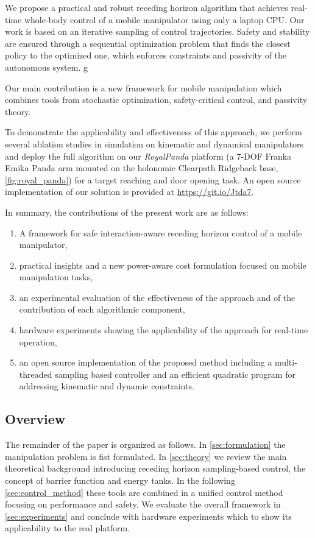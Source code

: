 We propose a practical and robust receding horizon algorithm that achieves real-time whole-body control of a mobile manipulator using only a laptop CPU. Our work is based on an iterative sampling of control trajectories. Safety and stability are ensured through a sequential optimization problem that finds the closest policy to the optimized one, which enforces constraints and passivity of the autonomous system. g

Our main contribution is a new framework for mobile manipulation which combines tools from stochastic optimization, safety-critical control, and passivity theory.

To demonstrate the applicability and effectiveness of this approach, we perform several ablation studies in simulation on kinematic and dynamical manipulators and deploy the full algorithm on our \textit{RoyalPanda} platform (a 7-DOF Franka Emika Panda arm mounted on the holonomic Clearpath Ridgeback base, \fig\ref{fig:royal_panda}) for a target reaching and door opening task. An open source implementation of our solution is provided at \url{https://git.io/Jtda7}.

In summary, the contributions of the present work are as follows:
\begin{enumerate}
    \item A framework for safe interaction-aware receding horizon control of a mobile manipulator,
    \item practical insights and a new power-aware cost formulation focused on mobile manipulation tasks,
    \item an experimental evaluation of the effectiveness of the approach and of the contribution of each algorithmic component,
    \item hardware experiments showing the applicability of the approach for real-time operation,
    \item an open source implementation of the proposed method including a multi-threaded sampling based controller and an efficient quadratic program for addressing kinematic and dynamic constraints.
    \end{enumerate}

\subsection{Overview}

The remainder of the paper is organized as follows. In 
\sect \ref{sec:formulation} the manipulation problem is fist formulated. In \sect \ref{sec:theory} we review the main theoretical background introducing receding horizon sampling-based control, the concept of barrier function and energy tanks. In the following \sect \ref{sec:control_method} these tools are combined in a unified control method focusing on performance and safety. We evaluate the overall framework in \sect \ref{sec:experiments} and conclude with  hardware experiments which to show its applicability to the real platform. 
